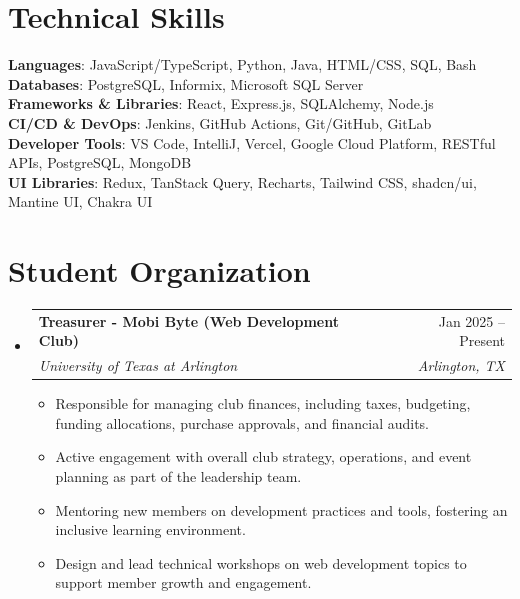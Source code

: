 \documentclass[letterpaper,10pt]{article}
\makeatletter
\newcommand{\resumeItem}[1]{
  \item\small{
    {#1 \vspace{-2pt}}
  }
}
\newcommand{\resumeSubheading}[4]{
  \vspace{-2pt}\item
    \begin{tabular*}{0.97\textwidth}[t]{l@{\extracolsep{\fill}}r}
      \textbf{#1} & #2 \\
      \textit{\small#3} & \textit{\small #4} \\
    \end{tabular*}\vspace{-7pt}
}
\newcommand{\resumeSubHeadingListStart}{\begin{itemize}[leftmargin=0.15in, label={}]}
\newcommand{\resumeSubHeadingListEnd}{\end{itemize}}
\newcommand{\resumeItemListStart}{\begin{itemize}}
\newcommand{\resumeItemListEnd}{\end{itemize}\vspace{-5pt}}
\makeatother
\begin{document}
\section{Technical Skills}
 \begin{itemize}[leftmargin=0.15in, label={}]
    \small{\item{
     \textbf{Languages}{: JavaScript/TypeScript, Python, Java, HTML/CSS, SQL, Bash} \\
     \textbf{Databases}{: PostgreSQL, Informix, Microsoft SQL Server} \\
     \textbf{Frameworks \& Libraries}{: React, Express.js, SQLAlchemy, Node.js} \\
     \textbf{CI/CD \& DevOps}{: Jenkins, GitHub Actions, Git/GitHub, GitLab} \\
     \textbf{Developer Tools}{: VS Code, IntelliJ, Vercel, Google Cloud Platform, RESTful APIs, PostgreSQL, MongoDB} \\
     \textbf{UI Libraries}{: Redux, TanStack Query, Recharts, Tailwind CSS, shadcn/ui, Mantine UI, Chakra UI}
    }}
 \end{itemize}

\section{Student Organization}
  \resumeSubHeadingListStart

    \resumeSubheading
      {Treasurer - Mobi Byte (Web Development Club)}{Jan 2025 -- Present}
      {University of Texas at Arlington}{Arlington, TX}
      \resumeItemListStart
        \resumeItem{Responsible for managing club finances, including taxes, budgeting, funding allocations, purchase approvals, and financial audits.}
        \resumeItem{Active engagement with overall club strategy, operations, and event planning as part of the leadership team.}
        \resumeItem{Mentoring new members on development practices and tools, fostering an inclusive learning environment.}
        \resumeItem{Design and lead technical workshops on web development topics to support member growth and engagement.}
      \resumeItemListEnd
      \resumeSubHeadingListEnd
\end{document}

